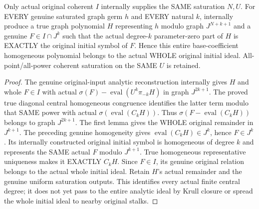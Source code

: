 \begin{theorem}
\label{hir:relative-normal-graph-central-original-initial-symbol-producer}
\leanok
Only actual original coherent $I$ internally supplies the SAME saturation $N,U$. For EVERY genuine saturated graph germ $h$ and EVERY natural $k$, internally produce a true graph polynomial $H$ representing $h$ modulo graph $J^{N+k+1}$ and a genuine $F\in I\cap J^k$ such that the actual degree-$k$ parameter-zero part of $H$ is EXACTLY the original initial symbol of $F$. Hence this entire base-coefficient homogeneous polynomial belongs to the actual WHOLE original initial ideal. All-point/all-power coherent saturation on the SAME $U$ is retained.
\end{theorem}
\begin{proof}
The genuine original-input analytic reconstruction internally gives $H$ and whole $F\in I$ with actual $\sigma(F)-\operatorname{eval}(U^k\pi_{-k}H)$ in graph $J^{2k+1}$. The proved true diagonal central homogeneous congruence identifies the latter term modulo that SAME power with actual $\sigma(\operatorname{eval}(C_kH))$. Thus $\sigma(F-\operatorname{eval}(C_kH))$ belongs to graph $J^{2k+1}$. The first lemma gives the WHOLE original remainder in $J^{k+1}$. The preceding genuine homogeneity gives $\operatorname{eval}(C_kH)\in J^k$, hence $F\in J^k$. Its internally constructed original initial symbol is homogeneous of degree $k$ and represents the SAME actual $F$ modulo $J^{k+1}$. True homogeneous representative uniqueness makes it EXACTLY $C_kH$. Since $F\in I$, its genuine original relation belongs to the actual whole initial ideal. Retain $H$'s actual remainder and the genuine uniform saturation outputs. This identifies every actual finite central degree; it does not yet pass to the entire analytic ideal by Krull closure or spread the whole initial ideal to nearby original stalks.
\end{proof}
